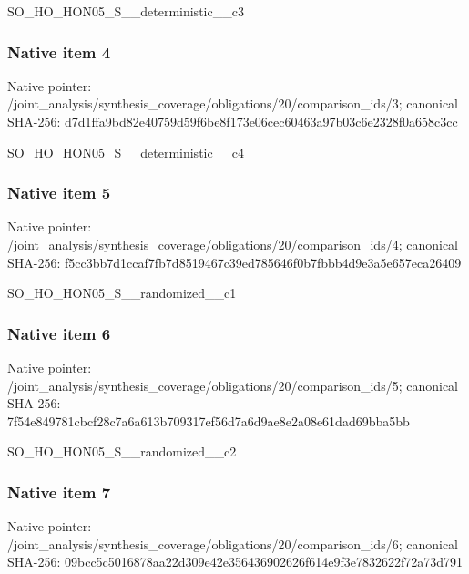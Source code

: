 \documentclass[10pt,a4paper]{article}
\begin{document}
\begingroup\raggedright\sloppy SO\_\allowbreak{}HO\_\allowbreak{}HON05\_\allowbreak{}S\_\allowbreak{}\_\allowbreak{}deterministic\_\allowbreak{}\_\allowbreak{}c3\par\endgroup

\subsubsection{Native item 4}
Native pointer: /joint\_\allowbreak{}analysis/synthesis\_\allowbreak{}coverage/obligations/20/comparison\_\allowbreak{}ids/3; canonical SHA-256: d7d1ffa9bd82e40759d59f6be8f173e06cec60463a97b03c6e2328f0a658c3cc

\begingroup\raggedright\sloppy SO\_\allowbreak{}HO\_\allowbreak{}HON05\_\allowbreak{}S\_\allowbreak{}\_\allowbreak{}deterministic\_\allowbreak{}\_\allowbreak{}c4\par\endgroup

\subsubsection{Native item 5}
Native pointer: /joint\_\allowbreak{}analysis/synthesis\_\allowbreak{}coverage/obligations/20/comparison\_\allowbreak{}ids/4; canonical SHA-256: f5cc3bb7d1ccaf7fb7d8519467c39ed785646f0b7fbbb4d9e3a5e657eca26409

\begingroup\raggedright\sloppy SO\_\allowbreak{}HO\_\allowbreak{}HON05\_\allowbreak{}S\_\allowbreak{}\_\allowbreak{}randomized\_\allowbreak{}\_\allowbreak{}c1\par\endgroup

\subsubsection{Native item 6}
Native pointer: /joint\_\allowbreak{}analysis/synthesis\_\allowbreak{}coverage/obligations/20/comparison\_\allowbreak{}ids/5; canonical SHA-256: 7f54e849781cbcf28c7a6a613b709317ef56d7a6d9ae8e2a08e61dad69bba5bb

\begingroup\raggedright\sloppy SO\_\allowbreak{}HO\_\allowbreak{}HON05\_\allowbreak{}S\_\allowbreak{}\_\allowbreak{}randomized\_\allowbreak{}\_\allowbreak{}c2\par\endgroup

\subsubsection{Native item 7}
Native pointer: /joint\_\allowbreak{}analysis/synthesis\_\allowbreak{}coverage/obligations/20/comparison\_\allowbreak{}ids/6; canonical SHA-256: 09bcc5c5016878aa22d309e42e356436902626f614e9f3e7832622f72a73d791
\end{document}
